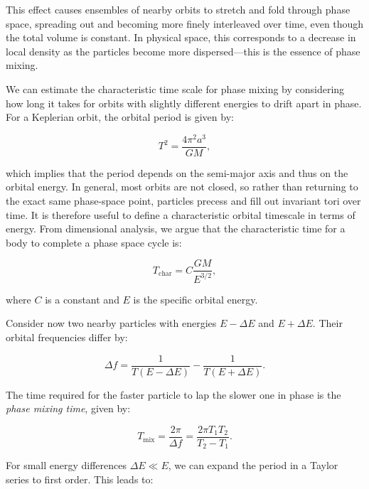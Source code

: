         This effect causes ensembles of nearby orbits to stretch and fold through phase space, spreading out and becoming more finely interleaved over time, even though the total volume is constant. In physical space, this corresponds to a decrease in local density as the particles become more dispersed—this is the essence of phase mixing.

        We can estimate the characteristic time scale for phase mixing by considering how long it takes for orbits with slightly different energies to drift apart in phase. For a Keplerian orbit, the orbital period is given by:

        \begin{equation}
        T^2 = \frac{4\pi^2 a^3}{GM},
        \end{equation}

        which implies that the period depends on the semi-major axis and thus on the orbital energy. In general, most orbits are not closed, so rather than returning to the exact same phase-space point, particles precess and fill out invariant tori over time. It is therefore useful to define a characteristic orbital timescale in terms of energy. From dimensional analysis, we argue that the characteristic time for a body to complete a phase space cycle is:

        \begin{equation}
        T_\mathrm{char} = C \frac{GM}{E^{3/2}},
        \end{equation}

        where $ C$ is a constant and $E$ is the specific orbital energy.

        Consider now two nearby particles with energies $E - \Delta E$ and $ E + \Delta E $. Their orbital frequencies differ by:

        \begin{equation}
        \Delta f = \frac{1}{T( E - \Delta E)} - \frac{1}{T(E + \Delta E)}.
        \end{equation}

        The time required for the faster particle to lap the slower one in phase is the \textit{phase mixing time}, given by:

        \begin{equation}
        T_\mathrm{mix} = \frac{2\pi}{\Delta f} = \frac{2\pi T_1 T_2}{T_2 - T_1}.
        \end{equation}

        For small energy differences \( \Delta E \ll E \), we can expand the period in a Taylor series to first order. This leads to:

